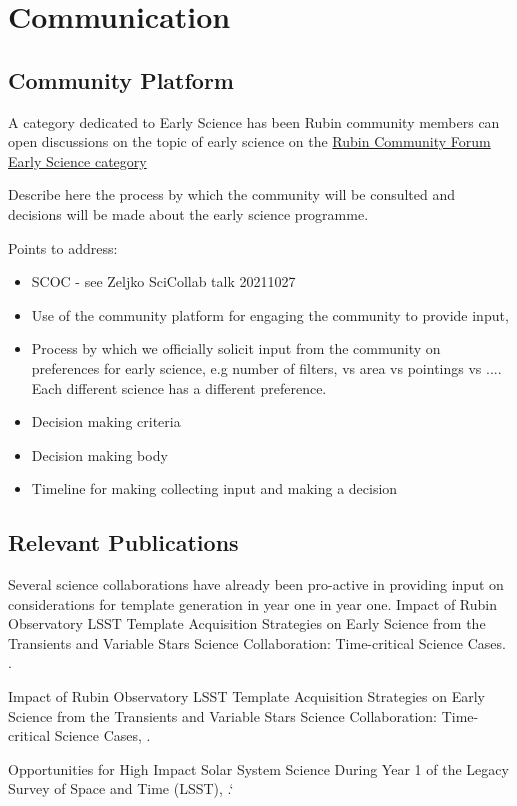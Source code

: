 \section{Communication}

\subsection{Community Platform}

A category dedicated to Early Science has been 
Rubin community members can open discussions on the topic of early science on the \href{https://community.lsst.org/t/about-the-early-science-category/5775}{Rubin Community Forum Early Science category}

Describe here the process by which the community will be consulted and decisions will be made about the early science programme. 

Points to address:
\begin{itemize}
\item SCOC - see Zeljko SciCollab talk 20211027
\item Use of the community platform for engaging the community to provide input,
\item Process by which we officially solicit  input from the community on preferences for early science, e.g number of filters, vs area vs pointings vs .... Each different science has a different preference. 
\item Decision making criteria 
\item Decision making body
\item Timeline for making collecting input and making a decision
\end{itemize}

\subsection{Relevant Publications}

Several science collaborations have already been pro-active in providing input on considerations for template generation in year one in year one. 
{\texbf  Impact of Rubin Observatory LSST Template Acquisition Strategies on Early Science from the Transients and Variable Stars Science Collaboration: Time-critical Science Cases.} .

{\texbf  Impact of Rubin Observatory LSST Template Acquisition Strategies on Early Science from the Transients and Variable Stars Science Collaboration: Time-critical Science Cases,} .

{\texbf  Opportunities for High Impact Solar System Science During Year 1 of the Legacy Survey of Space
and Time (LSST)},  .`
